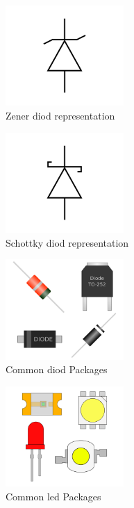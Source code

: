 \documentclass[a4paper,11pt]{report}
\begin{document}
\begin{figure}[H]
\centering
\includegraphics[width=0.4\textwidth]{diode3}
\caption{Zener \gls{diod} representation}
\end{figure}

\begin{figure}[H]
\centering
\includegraphics[width=0.4\textwidth]{diode4}
\caption{Schottky \gls{diod} representation}
\end{figure}

\begin{figure}[H]
\centering
\includegraphics[width=0.4\textwidth]{diodepackages}
\caption{Common \gls{diod} Packages}
\end{figure}

\begin{figure}[H]
\centering
\includegraphics[width=0.4\textwidth]{ledpackages}
\caption{Common \gls{led} Packages}
\end{figure}
\end{document}
